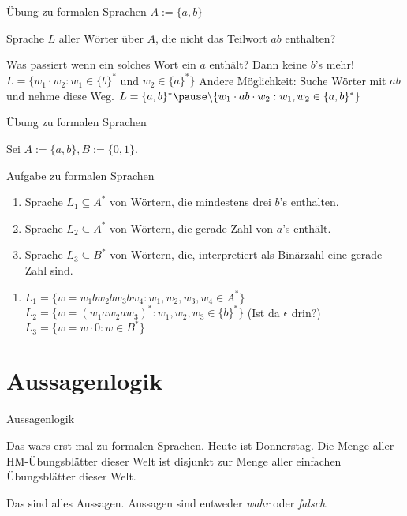 \documentclass[]{beamer}
\begin{document}
\begin{frame}{Übung zu formalen Sprachen}
	$A := \{a, b\}$
	
	\begin{itemize}
		\pitem Sprache $L$ aller Wörter über $A$, die nicht das Teilwort $ab$ enthalten?
		\begin{itemize}
			\pitem Was passiert wenn ein solches Wort ein $a$ enthält? \pause Dann keine $b$'s mehr!
			\pitem $L = \{w_1 \cdot w_2 : w_1 \in \{b\}^*$ und $w_2 \in \{a\}^* \}$
			\pitem Andere Möglichkeit\pause : Suche Wörter mit $ab$ und nehme diese Weg.
			\pitem $L = \{a, b\}^*\pause \backslash\{ w_1 \cdot ab \cdot w_2 : w_1, w_2 \in \{a,b\}^* \}$
		\end{itemize}
	\end{itemize}
\end{frame}

\begin{frame}{Übung zu formalen Sprachen}
	
	Sei $A := \{a, b\}, B := \{0, 1\}$.
	
	\begin{taskblock}{Aufgabe zu formalen Sprachen}
		\begin{enumerate}
			\item Sprache $L_1 \subseteq A^*$ von Wörtern, die mindestens drei $b$'s enthalten.
			\item Sprache $L_2 \subseteq A^*$ von Wörtern, die gerade Zahl von $a$'s enthält.
			\item Sprache $L_3 \subseteq B^*$ von Wörtern, die, interpretiert als Binärzahl eine gerade Zahl sind.
		\end{enumerate}
	\end{taskblock}

	\pause
	
	\begin{enumerate}
		\item $L_1 = \{w = w_1  b  w_2  b  w_3 b w_4 : w_1,w_2,w_3,w_4 \in A^* \}$
		\pitem $L_2 = \{w = (w_1 a w_2 a w_3)^* : w_1,w_2,w_3 \in \{b\}^* \}$ \pause (Ist da $\epsilon$ drin?)
		\pitem $L_3 = \{w = w \cdot 0 : w \in B^* \}$
	\end{enumerate}
\end{frame}

\section{Aussagenlogik}

\begin{frame}{Aussagenlogik}
	\begin{itemize}
		\pitem Das wars erst mal zu formalen Sprachen.
		\pitem Heute ist Donnerstag.
		\pitem Die Menge aller HM-Übungsblätter dieser Welt ist disjunkt zur Menge aller einfachen Übungsblätter dieser Welt.
	\end{itemize}

	\pause
	
	Das sind alles Aussagen. Aussagen sind entweder \emph{wahr} oder \emph{falsch}.
\end{frame}
\end{document}
